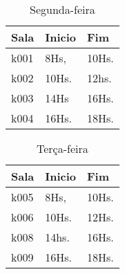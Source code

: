 \begin{table}[]
\centering
\caption{Segunda-feira}
\label{my-label}
\begin{tabular}{|l|l|l|}
\hline
\textbf{Sala}    &\textbf{Inicio}                     &\textbf{Fim}              \\ \hline
k001                     & 8Hs,                       & 10Hs.                    \\ \hline
k002                     & 10Hs.                      & 12hs.                    \\ \hline
k003                     & 14Hs                       & 16Hs.                    \\ \hline
k004                     & 16Hs.                      & 18Hs.                    \\ \hline
\end{tabular}
\end{table}
\begin{table}[]
\centering
\caption{Terça-feira}
\label{my-label}
\begin{tabular}{|l|l|l|}
\hline
\textbf{Sala}    &\textbf{Inicio}                     &\textbf{Fim}              \\ \hline						
k005                     & 8Hs,                       & 10Hs.                    \\ \hline
k006                     & 10Hs.                      & 12Hs.                    \\ \hline
k008                     & 14hs.                      & 16Hs.                    \\ \hline
k009                     & 16Hs.                      & 18Hs.                    \\ \hline
\end{tabular} 
\end{table}